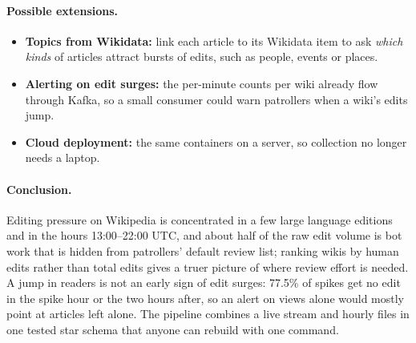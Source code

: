 \paragraph{Possible extensions.}
\begin{itemize}
  \item \textbf{Topics from Wikidata:} link each article to its Wikidata item to ask \emph{which kinds} of
    articles attract bursts of edits, such as people, events or places.
  \item \textbf{Alerting on edit surges:} the per-minute counts per wiki already flow through Kafka, so a
    small consumer could warn patrollers when a wiki's edits jump.
  \item \textbf{Cloud deployment:} the same containers on a server, so collection no longer needs a laptop.
\end{itemize}

\paragraph{Conclusion.} Editing pressure on Wikipedia is concentrated in a few large language editions
and in the hours 13:00--22:00 UTC, and about half of the raw edit volume is bot work that is hidden from
patrollers' default review list; ranking wikis by human edits rather than total edits gives a truer picture of where
review effort is needed. A jump in readers is not an early sign of edit surges: 77.5\% of
spikes get no edit in the spike hour or the two hours after, so an alert on views alone would mostly point at articles left alone. The pipeline
combines a live stream and hourly files in one tested star schema that anyone can rebuild with one command.
